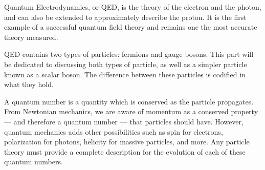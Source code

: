 \noindent Quantum Electrodynamics, or QED, is the theory of the electron and the photon, and can also be extended to approximately describe the proton. It is the first example of a successful quantum field theory and remains one the most accurate theory measured.

QED contains two types of particles: fermions and gauge bosons. This part will be dedicated to discussing both types of particle, as well as a simpler particle known as a scalar boson. The difference between these particles is codified in what  they hold.

A quantum number is a quantity which is conserved as the particle propagates. From Newtonian mechanics, we are aware of momentum as a conserved property --- and therefore a quantum number --- that particles should have. However, quantum mechanics adds other possibilities such as spin for electrons, polarization for photons, helicity for massive particles, and more. Any particle theory must provide a complete description for the evolution of each of these quantum numbers.